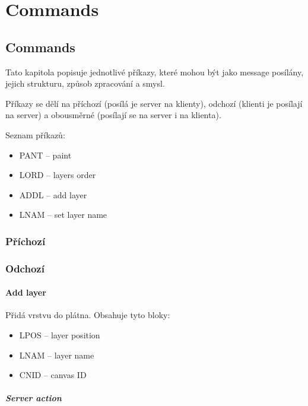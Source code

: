 \part{Commands}
\label{commands}

\chapter{Commands}
\label{text.commands}

Tato kapitola popisuje jednotlivé příkazy, které mohou být jako message posílány, jejich strukturu, způsob zpracování a smysl.

Příkazy se dělí na příchozí (posílá je server na klienty), odchozí (klienti je posílají na server) a obousměrné (posílají se na server i na klienta).

Seznam příkazů:

\begin{itemize}
	\item PANT -- paint
	\item LORD -- layers order
	\item ADDL -- add layer
	\item LNAM -- set layer name
\end{itemize}

\section{Příchozí}

\section{Odchozí}

\subsection{Add layer}

Přidá vrstvu do plátna. Obsahuje tyto bloky:

\begin{itemize}
	\item LPOS -- layer position
	\item LNAM -- layer name
	\item CNID -- canvas ID
\end{itemize}

\subsubsection{Server action}


